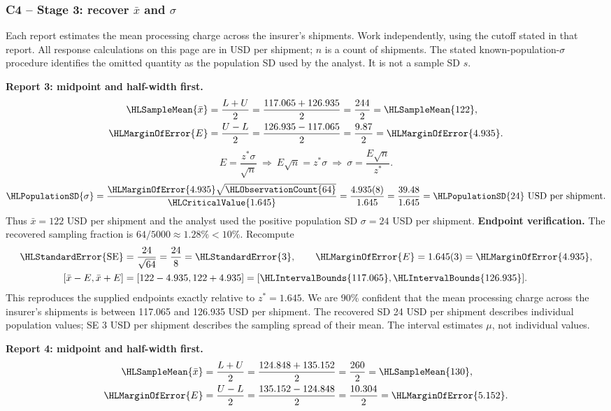 \subsubsection*{C4 -- Stage 3: recover $\bar x$ and $\sigma$}\label{sol:c4-3-c}
Each report estimates the mean processing charge across the insurer's shipments. Work independently, using the cutoff stated in that report. All response calculations on this page are in USD per shipment; $n$ is a count of shipments.
The stated known-population-$\sigma$ procedure identifies the omitted quantity as the population SD used by the analyst. It is not a sample SD $s$.
\par\noindent\textbf{Report 3: midpoint and half-width first.}
\[\begin{aligned}
\HLSampleMean{\bar x}&=\frac{L+U}{2}=\frac{117.065+126.935}{2}=\frac{244}{2}=\HLSampleMean{122},\\
\HLMarginOfError{E}&=\frac{U-L}{2}=\frac{126.935-117.065}{2}=\frac{9.87}{2}=\HLMarginOfError{4.935}.
\end{aligned}\]
\[E=\frac{z^*\sigma}{\sqrt n}\ \Longrightarrow\ E\sqrt n=z^*\sigma\ \Longrightarrow\ \sigma=\frac{E\sqrt n}{z^*}.\]
\[\HLPopulationSD{\sigma}=\frac{\HLMarginOfError{4.935}\sqrt{\HLObservationCount{64}}}{\HLCriticalValue{1.645}}=\frac{4.935(8)}{1.645}=\frac{39.48}{1.645}=\HLPopulationSD{24}\text{ USD per shipment}.\]
Thus $\bar x=122$ USD per shipment and the analyst used the positive population SD $\sigma=24$ USD per shipment.
\textbf{Endpoint verification.} The recovered sampling fraction is $64/5000\approx 1.28\%<10\%$. Recompute
\[\begin{aligned}
\HLStandardError{\mathrm{SE}}&=\frac{24}{\sqrt{64}}=\frac{24}{8}=\HLStandardError{3},\qquad \HLMarginOfError{E}=1.645(3)=\HLMarginOfError{4.935},\\
[\bar x-E,\bar x+E]&=[122-4.935,122+4.935]=[\HLIntervalBounds{117.065},\HLIntervalBounds{126.935}].
\end{aligned}\]
This reproduces the supplied endpoints exactly relative to $z^*=1.645$. We are 90\% confident that the mean processing charge across the insurer's shipments is between 117.065 and 126.935 USD per shipment.
The recovered SD 24 USD per shipment describes individual population values; SE 3 USD per shipment describes the sampling spread of their mean. The interval estimates $\mu$, not individual values.
\par\noindent\textbf{Report 4: midpoint and half-width first.}
\[\begin{aligned}
\HLSampleMean{\bar x}&=\frac{L+U}{2}=\frac{124.848+135.152}{2}=\frac{260}{2}=\HLSampleMean{130},\\
\HLMarginOfError{E}&=\frac{U-L}{2}=\frac{135.152-124.848}{2}=\frac{10.304}{2}=\HLMarginOfError{5.152}.
\end{aligned}\]
